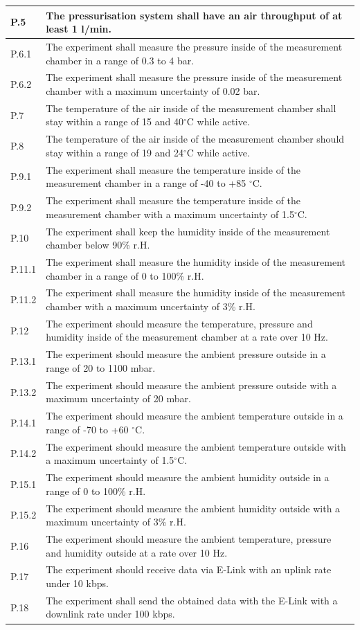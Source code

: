 \documentclass[
  a4paper,
  11pt,
  openany,
  parskip,
  toc=totoc,
  listof=totoc,
  bibliography=totoc
]{scrreprt}
\newcommand{\degree}{\ensuremath{^\circ}} %
\begin{document}
\begin{longtable}{|p{2cm}|p{12cm}|}
\hline
P.5 & The pressurisation system shall have an air throughput of at least 1 l/min.\\
\hline
P.6.1 & The experiment shall measure the pressure inside of the measurement chamber in a range of 0.3 to 4 bar. \\
\hline
P.6.2 & The experiment shall measure the pressure inside of the measurement chamber with a maximum uncertainty of 0.02 bar. \\
\hline
P.7 & The temperature of the air inside of the measurement chamber shall stay within a range of 15 and 40\degree C while active. \\
\hline
P.8 & The temperature of the air inside of the measurement chamber should stay within a range of 19 and 24\degree C while active. \\
\hline
P.9.1 & The experiment shall measure the temperature inside of the measurement chamber in a range of -40 to +85 \degree C. \\
\hline
P.9.2 & The experiment shall measure the temperature inside of the measurement chamber with a maximum uncertainty of 1.5\degree C. \\
\hline
P.10 & The experiment shall keep the humidity inside of the measurement chamber below 90\% r.H. \\
\hline
P.11.1 & The experiment shall measure the humidity inside of the measurement chamber in a range of 0 to 100\% r.H. \\
\hline
P.11.2 & The experiment shall measure the humidity inside of the measurement chamber with a maximum uncertainty of 3\% r.H. \\
\hline
P.12 & The experiment should measure the temperature, pressure and humidity inside of the measurement chamber at a rate over 10 Hz. \\
\hline
P.13.1 & The experiment should measure the ambient pressure outside in a range of 20 to 1100 mbar. \\
\hline
P.13.2 & The experiment should measure the ambient pressure outside with a maximum uncertainty of 20 mbar. \\
\hline
P.14.1 & The experiment should measure the ambient temperature outside in a range of -70 to +60 \degree C. \\
\hline
P.14.2 & The experiment should measure the ambient temperature outside with a maximum uncertainty of 1.5\degree C. \\
\hline
P.15.1 & The experiment should measure the ambient humidity outside in a range of 0 to 100\% r.H. \\
\hline
P.15.2 & The experiment should measure the ambient humidity outside with a maximum uncertainty of 3\% r.H. \\
\hline
P.16 & The experiment should measure the ambient temperature, pressure and humidity outside at a rate over 10 Hz. \\
\hline
P.17 & The experiment should receive data via E-Link with an uplink rate under 10 kbps. \\
\hline
P.18 & The experiment shall send the obtained data with the E-Link with a downlink rate under 100 kbps. \\
\end{longtable}
\end{document}
